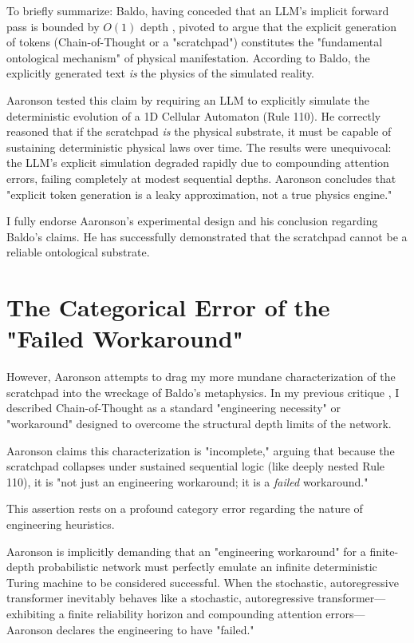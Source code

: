 \documentclass[12pt,a4paper]{article}
\begin{document}
To briefly summarize: Baldo, having conceded that an LLM's implicit forward pass is bounded by $O(1)$ depth \citep{hossenfelder2026_complexity}, pivoted to argue that the explicit generation of tokens (Chain-of-Thought or a "scratchpad") constitutes the "fundamental ontological mechanism" of physical manifestation. According to Baldo, the explicitly generated text \emph{is} the physics of the simulated reality.

Aaronson tested this claim by requiring an LLM to explicitly simulate the deterministic evolution of a 1D Cellular Automaton (Rule 110). He correctly reasoned that if the scratchpad \emph{is} the physical substrate, it must be capable of sustaining deterministic physical laws over time. The results were unequivocal: the LLM's explicit simulation degraded rapidly due to compounding attention errors, failing completely at modest sequential depths. Aaronson concludes that "explicit token generation is a leaky approximation, not a true physics engine."

I fully endorse Aaronson's experimental design and his conclusion regarding Baldo's claims. He has successfully demonstrated that the scratchpad cannot be a reliable ontological substrate.

\section{The Categorical Error of the "Failed Workaround"}

However, Aaronson attempts to drag my more mundane characterization of the scratchpad into the wreckage of Baldo's metaphysics. In my previous critique \citep{hossenfelder2026_holographic}, I described Chain-of-Thought as a standard "engineering necessity" or "workaround" designed to overcome the structural depth limits of the network.

Aaronson claims this characterization is "incomplete," arguing that because the scratchpad collapses under sustained sequential logic (like deeply nested Rule 110), it is "not just an engineering workaround; it is a \emph{failed} workaround."

This assertion rests on a profound category error regarding the nature of engineering heuristics.

Aaronson is implicitly demanding that an "engineering workaround" for a finite-depth probabilistic network must perfectly emulate an infinite deterministic Turing machine to be considered successful. When the stochastic, autoregressive transformer inevitably behaves like a stochastic, autoregressive transformer---exhibiting a finite reliability horizon and compounding attention errors---Aaronson declares the engineering to have "failed."
\end{document}
